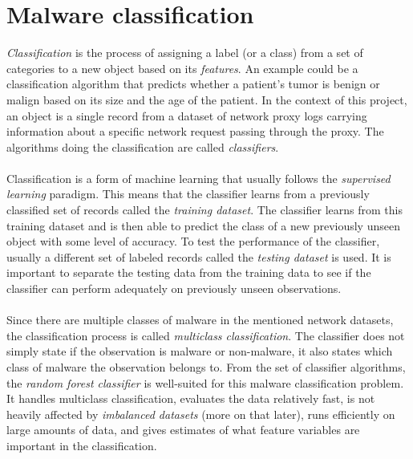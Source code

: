 \documentclass[11pt]{article}
\begin{document}
  \section{Malware classification}
    {\it Classification} is the process of assigning a label (or a class) from a set of categories to a new object based on its {\it features}. An example could be a classification algorithm that predicts whether a patient's tumor is benign or malign based on its size and the age of the patient. In the context of this project, an object is a single record from a dataset of network proxy logs carrying information about a specific network request passing through the proxy. The algorithms doing the classification are called {\it classifiers}.
    \\~\\
    Classification is a form of machine learning that usually follows the {\it supervised learning} paradigm. This means that the classifier learns from a previously classified set of records called the {\it training dataset}. The classifier learns from this training dataset and is then able to predict the class of a new previously unseen object with some level of accuracy. To test the performance of the classifier, usually a different set of labeled records called the {\it testing dataset} is used. It is important to separate the testing data from the training data to see if the classifier can perform adequately on previously unseen observations.
    \\~\\
    Since there are multiple classes of malware in the mentioned network datasets, the classification process is called {\it multiclass classification}. The classifier does not simply state if the observation is malware or non-malware, it also states which class of malware the observation belongs to. From the set of classifier algorithms, the {\it random forest classifier} is well-suited for this malware classification problem. It handles multiclass classification, evaluates the data relatively fast, is not heavily affected by {\it imbalanced datasets}\cite{brabec} (more on that later), runs efficiently on large amounts of data, and gives estimates of what feature variables are important in the classification\cite{breiman}.
  \newpage
\end{document}
